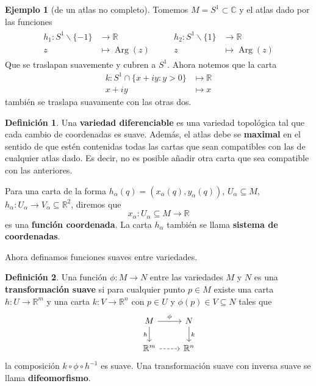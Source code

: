 \documentclass[spanish]{book}
\theoremstyle{definition}
\newtheorem*{defn}{Definición}
\newtheorem*{ejem}{Ejemplo}
\newcommand{\R}{\mathbb{R}}
\newcommand{\C}{\mathbb{C}}
\DeclareMathOperator{\Arg}{Arg}
\begin{document}
	\begin{ejem}[de un atlas no completo]
		Tomemos $M=S^1\subset\C$ y el atlas dado por las funciones
		\begin{align*}
			\begin{aligned}
				h_1:S^1\backslash\{-1\}&\to\R\\
				z&\mapsto\Arg(z)
			\end{aligned}
			\qquad
			\begin{aligned}
				h_2:S^1\backslash\{1\}&\to\R\\
				z&\mapsto\Arg(z)
			\end{aligned}
		\end{align*}
		Que se traslapan suavemente y cubren a $S^1$. Ahora notemos que la carta
		\begin{align*}
			k:S^1\cap\{x+iy:y>0\}&\mapsto\R\\
			x+iy&\mapsto x
		\end{align*}
		también se traslapa suavamente con las otras dos.
	\end{ejem}
	\begin{defn}
		Una \textbf{variedad diferenciable} es una variedad topológica tal que cada cambio de coordenadas es suave. Además, el atlas debe se \textbf{maximal} en el sentido de que estén contenidas todas las cartas que sean compatibles con las de cualquier atlas dado. Es decir, no es posible añadir otra carta que sea compatible con las anteriores.
		
		Para una carta de la forma $h_\alpha(q)=(x_\alpha(q),y_\alpha(q))$, $U_\alpha\subseteq M$, $h_\alpha:U_\alpha\to V_\alpha\subseteq\R^2$, diremos que 
		\[x_\alpha:U_\alpha\subseteq M\to \R\]
		es una \textbf{función coordenada}. La carta $h_\alpha$ también se llama \textbf{sistema de coordenadas}.
	\end{defn}
	Ahora definamos funciones suaves entre variedades.
	\begin{defn}
		Una función $\phi:M\to N$ entre las variedades $M$ y $N$ es una \textbf{transformación suave} si para cualquier punto $p\in M$ existe una carta $h:U\to \R^m$ y una carta $k:V\to\R^n$ con $p\in U$ y $\phi(p)\in V\subseteq N$ tales que 
		\[\begin{tikzcd}
			&M\arrow{r}{\phi}\arrow[swap]{d}{h}&N\arrow{d}{k}\\
			&\R^m\arrow[dashed]{r}&\R^n
		\end{tikzcd}\]
		la composición $k\circ\phi \circ h^{-1}$ es suave. Una transformación suave con inversa suave se llama \textbf{difeomorfismo}.
	\end{defn}
\end{document}
